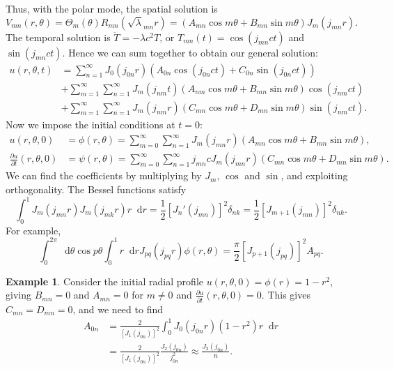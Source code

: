 \documentclass[12pt]{article}
\newcommand{\diff}{\mathop{}\!\mathrm{d}}
\theoremstyle{definition}
\newtheorem{example}{Example}[section]
\theoremstyle{remark}
\begin{document}
Thus, with the polar mode, the spatial solution is
\[
	V_{mn}(r, \theta) = \Theta_m(\theta) R_{mn}(\sqrt \lambda_{mn} r) = (A_{mn} \cos m \theta + B_{mn} \sin m \theta) J_m(j_{mn} r)
.\]
The temporal solution is $\ddot T = - \lambda c^2 T$, or $T_{mn}(t) = \cos(j_{mn} ct)$ and $\sin (j_{mn} ct)$. Hence we can sum together to obtain our general solution:
\begin{align*}
	u(r, \theta, t) &= \sum_{n = 1}^{\infty}J_0(j_{0n} r) (A_{0n}\cos (j_{0n} ct) + C_{0n} \sin (j_{0n} ct)) \\
			&+ \sum_{m = 1}^{\infty} \sum_{n = 1}^{\infty} J_m(j_{nm}t)(A_{nm} \cos m \theta+ B_{mn} \sin m \theta) \cos (j_{nm} ct) \\
			&+ \sum_{m = 1}^{\infty} \sum_{n = 1}^{\infty} J_m(j_{nm}r)(C_{mn} \cos m \theta + D_{mn} \sin m \theta) \sin (j_{nm} ct).
\end{align*}
Now we impose the initial conditions at $t = 0$:
\begin{align*}
	u(r, \theta, 0) &= \phi(r, \theta) = \sum_{m = 0}^{\infty} \sum_{n = 1}^{\infty} J_m(j_{mn}r) (A_{mn} \cos m \theta + B_{mn} \sin m \theta), \\
	\frac{\partial u}{\partial t}(r, \theta, 0) &= \psi(r, \theta) = \sum_{m = 0}^{\infty} \sum_{n = 1}^{\infty} j_{mn}c J_m(j_{mn} r) (C_{mn} \cos m \theta + D_{mn} \sin m \theta).
\end{align*}
We can find the coefficients by multiplying by $J_m$, $\cos$ and $\sin$, and exploiting orthogonality. The Bessel functions satisfy
\[
	\int_{0}^{1}J_m(j_{mn}r)J_m(j_{mk}r)r \diff r = \frac{1}{2} [J_n'(j_{mn})]^2 \delta_{nk} = \frac{1}{2} [J_{m+1}(j_{mn})]^2\delta_{nk}
.\]
For example,
\[
	\int_{0}^{2\pi}\diff \theta \cos p \theta \int_{0}^{1} r \diff r J_{pq}(j_{pq} r) \phi(r, \theta) = \frac{\pi}{2} [J_{p+1}(j_{pq})]^2 A_{pq}
.\]

\begin{adjustbox}{minipage = \columnwidth - 25.5pt, margin=1em, frame=1pt, margin=0em}
\begin{example}
	Consider the initial radial profile $u(r, \theta, 0) = \phi(r) = 1 - r^2$, giving $B_{mn} = 0$ and $A_{mn} = 0$ for $m \neq 0$ and $\frac{\partial u}{\partial t} (r, \theta, 0) = 0$. This gives $C_{mn} = D_{mn} = 0$, and we need to find
	\begin{align*}
		A_{0n} &= \frac{2}{[J_1(j_{0n})]^2} \int_{0}^{1}J_0(j_{0n}r)(1 - r^2)r \diff r \\
		       &= \frac{2}{[J_1(j_{0n})]^2} \frac{J_2(j_{0n})}{j_{0n}^2} \approx \frac{J_2(j_{0n})}{n}.
	\end{align*}
\end{example}
\end{adjustbox}
\end{document}
